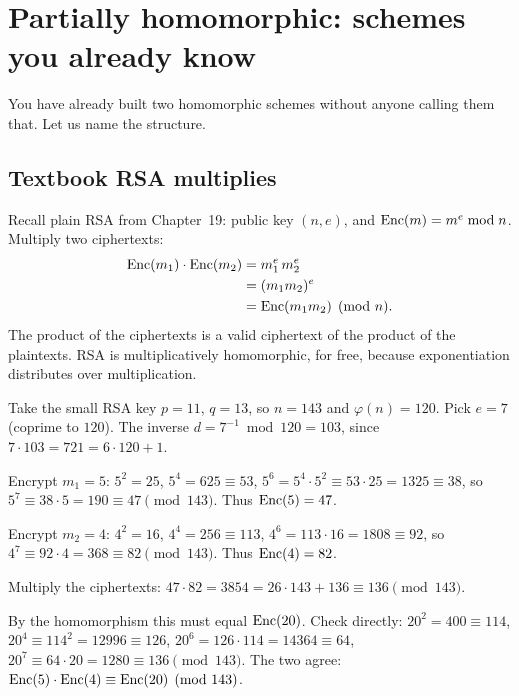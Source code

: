 \section{Partially homomorphic: schemes you already know}
\label{ch33:partial}

You have already built two homomorphic schemes without anyone calling them that. Let us name the structure.

\subsection{Textbook RSA multiplies}
\label{ch33:rsa-mult}

Recall plain RSA from Chapter~19: public key $(n,e)$, and $\operatorname{Enc}(m) = m^e \bmod n$. Multiply two ciphertexts:
\begin{align*}
  \operatorname{Enc}(m_1)\cdot \operatorname{Enc}(m_2) &= m_1^e\, m_2^e \\
  &= (m_1 m_2)^e \\
  &= \operatorname{Enc}(m_1 m_2) \pmod n .
\end{align*}
The product of the ciphertexts is a valid ciphertext of the product of the plaintexts. RSA is multiplicatively homomorphic, for free, because exponentiation distributes over multiplication.

\begin{example}
\label{ch33:rsa-example}
Take the small RSA key $p=11$, $q=13$, so $n=143$ and $\varphi(n)=120$. Pick $e=7$ (coprime to $120$). The inverse $d = 7^{-1} \bmod 120 = 103$, since $7\cdot 103 = 721 = 6\cdot 120 + 1$.

Encrypt $m_1 = 5$: $5^2=25$, $5^4 = 625 \equiv 53$, $5^6 = 5^4\cdot 5^2 \equiv 53\cdot 25 = 1325 \equiv 38$, so $5^7 \equiv 38\cdot 5 = 190 \equiv 47 \pmod{143}$. Thus $\operatorname{Enc}(5) = 47$.

Encrypt $m_2 = 4$: $4^2=16$, $4^4 = 256 \equiv 113$, $4^6 = 113\cdot 16 = 1808 \equiv 92$, so $4^7 \equiv 92\cdot 4 = 368 \equiv 82 \pmod{143}$. Thus $\operatorname{Enc}(4) = 82$.

Multiply the ciphertexts: $47 \cdot 82 = 3854 = 26\cdot 143 + 136 \equiv 136 \pmod{143}$.

By the homomorphism this must equal $\operatorname{Enc}(20)$. Check directly: $20^2 = 400 \equiv 114$, $20^4 \equiv 114^2 = 12996 \equiv 126$, $20^6 = 126\cdot 114 = 14364 \equiv 64$, $20^7 \equiv 64\cdot 20 = 1280 \equiv 136 \pmod{143}$. The two agree: $\operatorname{Enc}(5)\cdot\operatorname{Enc}(4) \equiv \operatorname{Enc}(20) \pmod{143}$.
\end{example}

